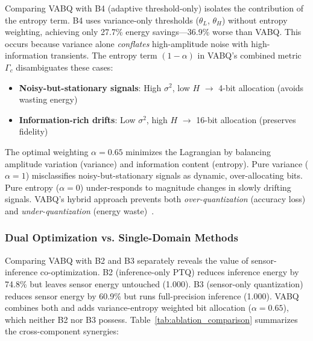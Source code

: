 Comparing VABQ with B4 (adaptive threshold-only) isolates the contribution of the entropy term. B4 uses variance-only thresholds ($\theta_L$, $\theta_H$) without entropy weighting, achieving only 27.7\% energy savings---36.9\% worse than VABQ. This occurs because variance alone \textit{conflates} high-amplitude noise with high-information transients. The entropy term $(1-\alpha)$ in VABQ's combined metric $\Gamma_c$ disambiguates these cases:

\begin{itemize}
    \item \textbf{Noisy-but-stationary signals}: High $\sigma^2$, low $H$ $\rightarrow$ 4-bit allocation (avoids wasting energy)
    \item \textbf{Information-rich drifts}: Low $\sigma^2$, high $H$ $\rightarrow$ 16-bit allocation (preserves fidelity)
\end{itemize}

The optimal weighting $\alpha = 0.65$ minimizes the Lagrangian by balancing amplitude variation (variance) and information content (entropy). Pure variance ($\alpha = 1$) misclassifies noisy-but-stationary signals as dynamic, over-allocating bits. Pure entropy ($\alpha = 0$) under-responds to magnitude changes in slowly drifting signals. VABQ's hybrid approach prevents both \textit{over-quantization} (accuracy loss) and \textit{under-quantization} (energy waste)~\cite{informationtheory2023, smoothquant2024}.

\subsubsection{Dual Optimization vs. Single-Domain Methods}

Comparing VABQ with B2 and B3 separately reveals the value of sensor-inference co-optimization. B2 (inference-only PTQ) reduces inference energy by 74.8\% but leaves sensor energy untouched (1.000). B3 (sensor-only quantization) reduces sensor energy by 60.9\% but runs full-precision inference (1.000). VABQ combines both and adds variance-entropy weighted bit allocation ($\alpha=0.65$), which neither B2 nor B3 possess. Table~\ref{tab:ablation_comparison} summarizes the cross-component synergies:

